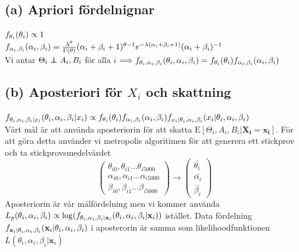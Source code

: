 \documentclass{assignment}
\begin{document}
\subsection*{(a) Apriori fördelnignar} 
$f_{\theta_i}(\theta_i)\propto 1$
\\ $f_{\alpha_i,\beta_i}(\alpha_i,\beta_i) = \frac{\lambda^\theta}{\Gamma(\theta)}(\alpha_i+\beta_i+1)^{\theta-1}e^{-\lambda(\alpha_i+\beta_i+1)}(\alpha_i+\beta_i)^{-1}$  
\\ Vi antar $\Theta_i \perp\!\!\!\!\perp A_i,B_i$ för alla $i$ $\Longrightarrow f_{\theta_i,\alpha_i,\beta_i}(\theta_i,\alpha_i,\beta_i) = f_{\theta_i}(\theta_i)f_{\alpha_i,\beta_i}(\alpha_i,\beta_i)$ 
\subsection*{(b) Aposteriori för $X_i$ och skattning} 
$f_{\theta_i, \alpha_i,\beta_i|x_i}(\theta_i, \alpha_i,\beta_i|x_i) \propto f_{\theta_i}(\theta_i)f_{\alpha_i,\beta_i}(\alpha_i,\beta_i) f_{x_i|\theta_i,\alpha_i,\beta_i}(x_i|\theta_i,\alpha_i,\beta_i)$
\\ Vårt mål är att använda aposteriorin för att skatta $\text{E}[\Theta_i,A_i,B_i|\mathbf{X_i}=\mathbf{x_i}]$.
För att göra detta använder vi metropolis algoritimen för att generera ett stickprov och ta stickprovsmedelvärdet
$$
\begin{pmatrix} \theta_{i0},\theta_{i1} \dots \theta_{i5000}\\ \alpha_{i0},\alpha_{i1}\dots \alpha_{i5000}  \\ \beta_{i0},\beta_{i1}\dots \beta_{i5000}\end{pmatrix} \longrightarrow
\begin{pmatrix}
    \bar{\theta_i} \\
    \bar{\alpha_i} \\
    \bar{\beta_i}
\end{pmatrix}
$$  
Aposteriorin är vår målfördelning men vi kommer använda $L_{p}(\theta_i, \alpha_i,\beta_i) \propto \log(f_{\theta_i, \alpha_i,\beta_i|\mathbf{x}_i}(\theta_i, \alpha_i,\beta_i|\mathbf{x}_i))$ istället.
Data fördelning $f_{\mathbf{x}_i|\theta_i, \alpha_i,\beta_i}(\mathbf{x}_i|\theta_i, \alpha_i,\beta_i)$ i aposterorin är samma som likelihoodfunktionen 
$L(\theta_i, \alpha_i,\beta_i|\mathbf{x}_i)$
 
\end{document}

